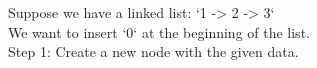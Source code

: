 \documentclass[preview]{standalone}
\begin{document}
Suppose we have a linked list: `1 -> 2 -> 3`\\We want to insert `0` at the beginning of the list.\\Step 1: Create a new node with the given data.\\
\end{document}
